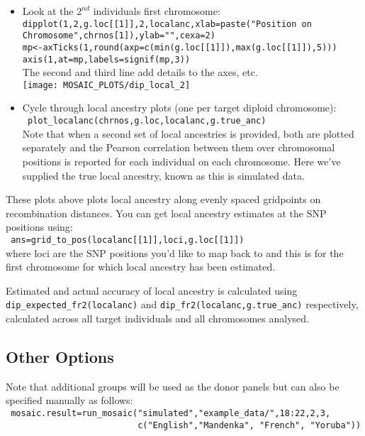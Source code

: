 \documentclass{article}
\begin{document}
\begin{itemize}
\item Look at the $2^{nd}$ individuals first chromosome:\\
  \verb-dipplot(1,2,g.loc[[1]],2,localanc,xlab=paste("Position on Chromosome",chrnos[1]),ylab="",cexa=2)-\\
    \verb+mp<-axTicks(1,round(axp=c(min(g.loc[[1]]),max(g.loc[[1]]),5)))+\\
    \verb+axis(1,at=mp,labels=signif(mp,3))+\\
    The second and third line add details to the axes, etc. \\
    \texttt{[image: MOSAIC\_PLOTS/dip\_local\_2]}\\

\item Cycle through local ancestry plots (one per target diploid chromosome):\\
\verb+ plot_localanc(chrnos,g.loc,localanc,g.true_anc)+ \\
Note that when a second set of local ancestries is provided, both are plotted separately and the Pearson correlation
between them over chromosomal positions is reported for each individual on each chromosome. Here we've supplied the true local ancestry, known as this is simulated data. 
\end{itemize}

These plots above plots local ancestry along evenly spaced gridpoints on recombination distances. You can get 
local ancestry estimates at the SNP positions using:\\
\verb+ ans=grid_to_pos(localanc[[1]],loci,g.loc[[1]])+\\
where loci are the SNP positions you'd like to map back to and this is for the first chromosome for which local ancestry has been estimated.

Estimated and actual accuracy of local ancestry is calculated using \verb+dip_expected_fr2(localanc)+ and 
\verb+dip_fr2(localanc,g.true_anc)+ respectively, calculated across all target individuals and all chromosomes analysed. 

\subsection{Other Options}
Note that additional groups will be used as the donor panels but can also be specified manually as follows:\\
\verb+ mosaic.result=run_mosaic("simulated","example_data/",18:22,2,3,+\\
\verb+                          c("English","Mandenka", "French", "Yoruba"))+
\end{document}
